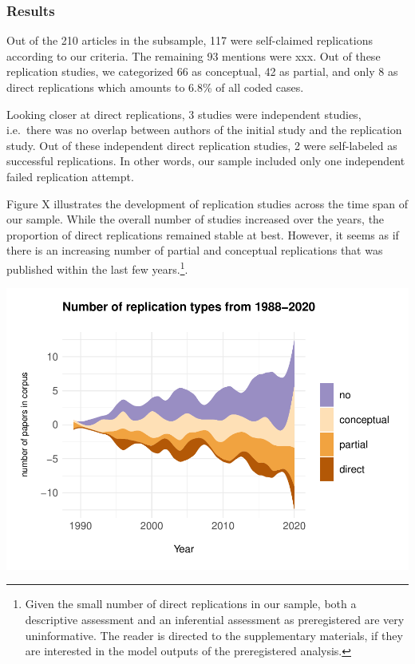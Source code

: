 \documentclass[]{elsarticle} %
\begin{document}
\hypertarget{results-1}{%
\subsubsection{Results}\label{results-1}}

Out of the 210 articles in the subsample, 117 were self-claimed
replications according to our criteria. The remaining 93 mentions were
xxx. Out of these replication studies, we categorized 66 as conceptual,
42 as partial, and only 8 as direct replications which amounts to 6.8\%
of all coded cases.

Looking closer at direct replications, 3 studies were independent
studies, i.e.~there was no overlap between authors of the initial study
and the replication study. Out of these independent direct replication
studies, 2 were self-labeled as successful replications. In other words,
our sample included only one independent failed replication attempt.

Figure X illustrates the development of replication studies across the
time span of our sample. While the overall number of studies increased
over the years, the proportion of direct replications remained stable at
best. However, it seems as if there is an increasing number of partial
and conceptual replications that was published within the last few
years.\footnote{Given the small number of direct replications in our
  sample, both a descriptive assessment and an inferential assessment as
  preregistered are very uninformative. The reader is directed to the
  supplementary materials, if they are interested in the model outputs
  of the preregistered analysis.}.

\begin{center}\includegraphics[width=1\linewidth]{ReplicationLing_files/figure-latex/steam_plot-1} \end{center}
\end{document}
